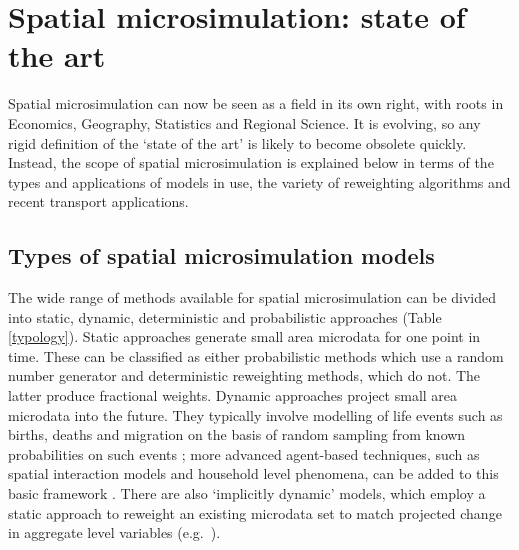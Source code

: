 % 
% 
% 

\section{Spatial microsimulation: state of the art}
\label{s:sotart}
Spatial microsimulation can now be seen as a field in its own right, with roots
in Economics, Geography, Statistics and Regional Science.  It is
evolving, so any rigid definition of the `state of the art' is likely to become
obsolete quickly. Instead, the scope of spatial
microsimulation is explained below in terms of the types and applications of models
in use, the variety of reweighting algorithms and recent transport applications.

\subsection{Types of spatial microsimulation models} %
\label{types-msim}
The wide range of methods available for spatial microsimulation can be divided
into static, dynamic, deterministic and probabilistic approaches (Table
\ref{typology}). Static approaches generate small
area microdata for one point in time. These can be classified as
either probabilistic methods which use a random number generator and
deterministic reweighting methods, which do not. The latter produce
fractional weights. Dynamic approaches project small
area microdata into the future. They typically involve modelling of
life events such as births, deaths and migration on the basis of random
sampling from known probabilities on such events \citep{Ballas2005c,
Vidyattama2010}; more advanced agent-based techniques, such as spatial
interaction models and household level phenomena, can be added to this basic
framework \citep{Wu2008, Wu2010}. There
are also `implicitly dynamic' models, which employ a static
approach to reweight an existing microdata set to match
projected change in aggregate level variables
(e.g.~\citealp{Ballas2005-ireland}).

